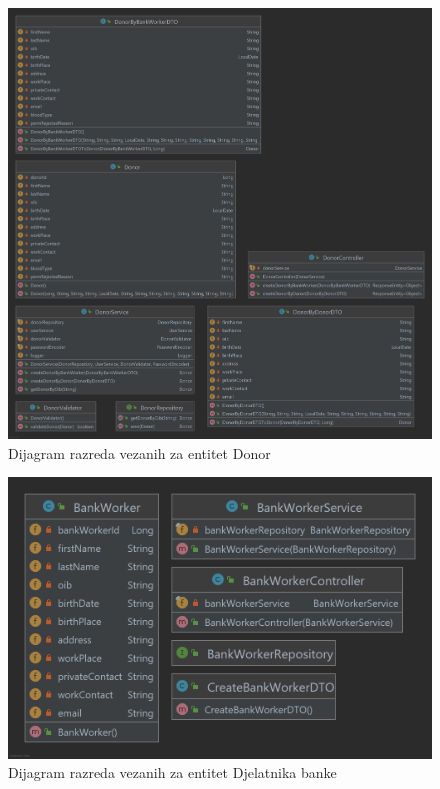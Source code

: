                 \begin{figure}[H]
                    \includegraphics[scale=0.20]{slike/donor.png}
        			\centering
        			\caption{Dijagram razreda vezanih za entitet Donor}
        			\label{fig:hztm-stranica}
        		\end{figure}
        		
        		\begin{figure}[H]
                    \includegraphics[scale=0.25]{slike/bankworker.png}
        			\centering
        			\caption{Dijagram razreda vezanih za entitet Djelatnika banke}
        			\label{fig:hztm-stranica}
        		\end{figure}
        		
